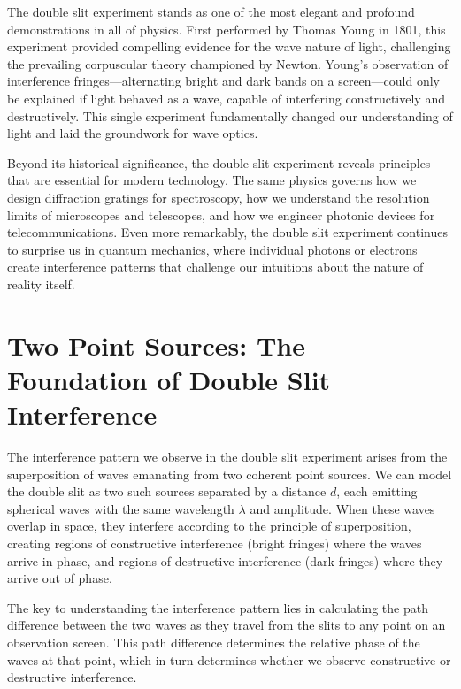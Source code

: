 \documentclass[
  a4paper,
]{book}
\begin{document}
The double slit experiment stands as one of the most elegant and
profound demonstrations in all of physics. First performed by Thomas
Young in 1801, this experiment provided compelling evidence for the wave
nature of light, challenging the prevailing corpuscular theory
championed by Newton. Young's observation of interference
fringes---alternating bright and dark bands on a screen---could only be
explained if light behaved as a wave, capable of interfering
constructively and destructively. This single experiment fundamentally
changed our understanding of light and laid the groundwork for wave
optics.

Beyond its historical significance, the double slit experiment reveals
principles that are essential for modern technology. The same physics
governs how we design diffraction gratings for spectroscopy, how we
understand the resolution limits of microscopes and telescopes, and how
we engineer photonic devices for telecommunications. Even more
remarkably, the double slit experiment continues to surprise us in
quantum mechanics, where individual photons or electrons create
interference patterns that challenge our intuitions about the nature of
reality itself.

\section{Two Point Sources: The Foundation of Double Slit
Interference}\label{two-point-sources-the-foundation-of-double-slit-interference}

The interference pattern we observe in the double slit experiment arises
from the superposition of waves emanating from two coherent point
sources. We can model the double slit as two such sources separated by a
distance \(d\), each emitting spherical waves with the same wavelength
\(\lambda\) and amplitude. When these waves overlap in space, they
interfere according to the principle of superposition, creating regions
of constructive interference (bright fringes) where the waves arrive in
phase, and regions of destructive interference (dark fringes) where they
arrive out of phase.

The key to understanding the interference pattern lies in calculating
the path difference between the two waves as they travel from the slits
to any point on an observation screen. This path difference determines
the relative phase of the waves at that point, which in turn determines
whether we observe constructive or destructive interference.
\end{document}
